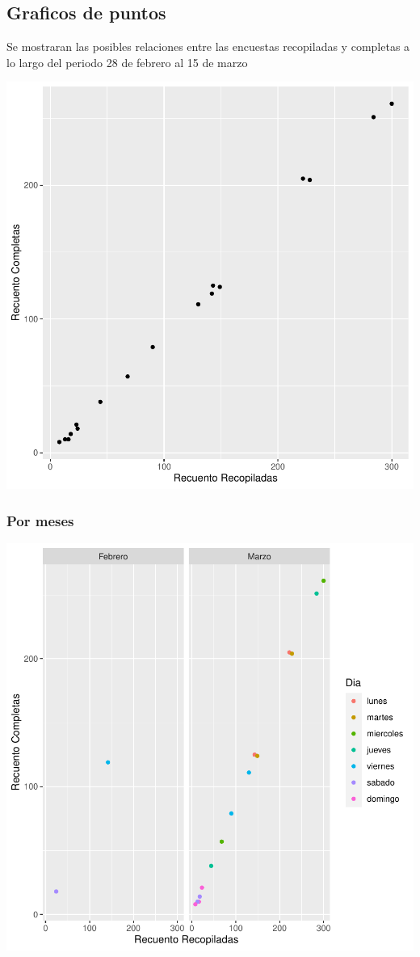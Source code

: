\documentclass{article}
\begin{document}
\subsection{Graficos de puntos}
Se mostraran las posibles relaciones entre las encuestas recopiladas y completas a lo largo del periodo 28 de febrero al 15 de marzo

\includegraphics{seguimento2-027}

\subsubsection{Por meses}

\includegraphics{seguimento2-028}
\end{document}
